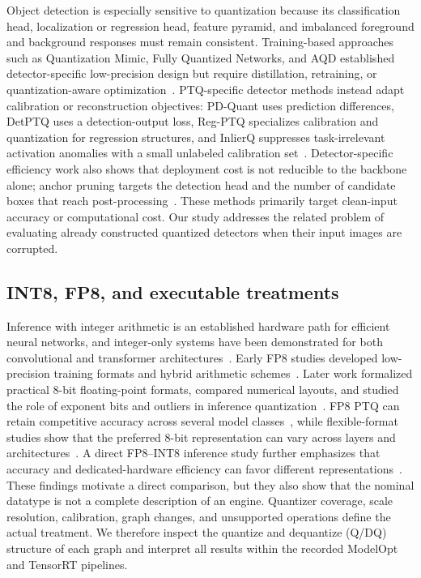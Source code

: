 \documentclass[a4paper,fleqn]{cas-dc}
\begin{document}
Object detection is especially sensitive to quantization because its classification head, localization or regression head, feature pyramid, and imbalanced foreground and background responses must remain consistent. Training-based approaches such as Quantization Mimic, Fully Quantized Networks, and AQD established detector-specific low-precision design but require distillation, retraining, or quantization-aware optimization~\citep{wei2018quantizationmimic,li2019fullyquantized,chen2021aqd}. PTQ-specific detector methods instead adapt calibration or reconstruction objectives: PD-Quant uses prediction differences, DetPTQ uses a detection-output loss, Reg-PTQ specializes calibration and quantization for regression structures, and InlierQ suppresses task-irrelevant activation anomalies with a small unlabeled calibration set~\citep{liu2023pdquant,niu2023detptq,ding2024regptq,kim2026inlierq}. Detector-specific efficiency work also shows that deployment cost is not reducible to the backbone alone; anchor pruning targets the detection head and the number of candidate boxes that reach post-processing~\citep{bonnaerens2022anchor}. These methods primarily target clean-input accuracy or computational cost. Our study addresses the related problem of evaluating already constructed quantized detectors when their input images are corrupted.

\subsection{INT8, FP8, and executable treatments}

Inference with integer arithmetic is an established hardware path for efficient neural networks, and integer-only systems have been demonstrated for both convolutional and transformer architectures~\citep{jacob2018integer,yao2021hawqv3,tien2026onnx}. Early FP8 studies developed low-precision training formats and hybrid arithmetic schemes~\citep{wang2018fp8training,sun2019hfp8}. Later work formalized practical 8-bit floating-point formats, compared numerical layouts, and studied the role of exponent bits and outliers in inference quantization~\citep{micikevicius2022fp8,noune2022eightbit,kuzmin2022fp8}. FP8 PTQ can retain competitive accuracy across several model classes~\citep{shen2024fp8}, while flexible-format studies show that the preferred 8-bit representation can vary across layers and architectures~\citep{zhang2023flexible8bit}. A direct FP8--INT8 inference study further emphasizes that accuracy and dedicated-hardware efficiency can favor different representations~\citep{vanbaalen2023fp8int8}. These findings motivate a direct comparison, but they also show that the nominal datatype is not a complete description of an engine. Quantizer coverage, scale resolution, calibration, graph changes, and unsupported operations define the actual treatment. We therefore inspect the quantize and dequantize (Q/DQ) structure of each graph and interpret all results within the recorded ModelOpt and TensorRT pipelines.
\end{document}
